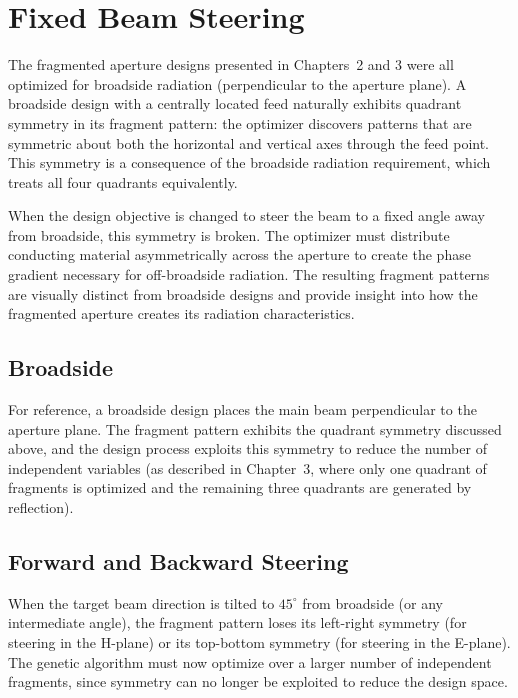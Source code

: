 \section{Fixed Beam Steering}
\label{sec:ch4steer}

The fragmented aperture designs presented in Chapters~2 and 3 were all optimized for broadside radiation (perpendicular to the aperture plane).  A broadside design with a centrally located feed naturally exhibits quadrant symmetry in its fragment pattern: the optimizer discovers patterns that are symmetric about both the horizontal and vertical axes through the feed point.  This symmetry is a consequence of the broadside radiation requirement, which treats all four quadrants equivalently.

When the design objective is changed to steer the beam to a fixed angle away from broadside, this symmetry is broken.  The optimizer must distribute conducting material asymmetrically across the aperture to create the phase gradient necessary for off-broadside radiation.  The resulting fragment patterns are visually distinct from broadside designs and provide insight into how the fragmented aperture creates its radiation characteristics.

\subsection{Broadside}

For reference, a broadside design places the main beam perpendicular to the aperture plane.  The fragment pattern exhibits the quadrant symmetry discussed above, and the design process exploits this symmetry to reduce the number of independent variables (as described in Chapter~3, where only one quadrant of fragments is optimized and the remaining three quadrants are generated by reflection).

\subsection{Forward and Backward Steering}

When the target beam direction is tilted to $45^\circ$ from broadside (or any intermediate angle), the fragment pattern loses its left-right symmetry (for steering in the H-plane) or its top-bottom symmetry (for steering in the E-plane).  The genetic algorithm must now optimize over a larger number of independent fragments, since symmetry can no longer be exploited to reduce the design space.

